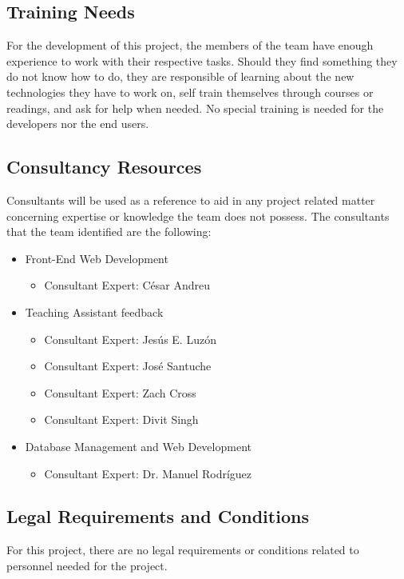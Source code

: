 \subsection{Training Needs}

For the development of this project, the members of the team have enough
experience to work with their respective tasks. Should they find something they
do not know how to do, they are responsible of learning about the new
technologies they have to work on, self train themselves through courses or
readings, and ask for help when needed. No special training is needed for the developers nor the end users.

\subsection{Consultancy Resources}

Consultants will be used as a reference to aid in any project
related matter concerning expertise or knowledge the team does not possess. The consultants that the team identified are the following:

\begin{itemize}
\item Front-End Web Development
\begin{itemize}
\item Consultant Expert: César Andreu
\end{itemize}
\item Teaching Assistant feedback
\begin{itemize}
\item Consultant Expert: Jesús E. Luzón
\item Consultant Expert: José Santuche
\item Consultant Expert: Zach Cross
\item Consultant Expert: Divit Singh
\end{itemize}
\item Database Management and Web Development
\begin{itemize}
\item Consultant Expert: Dr. Manuel Rodríguez
\end{itemize}
\end{itemize}

\subsection{Legal Requirements and Conditions}

For this project, there are no legal requirements or conditions related to
personnel needed for the project.